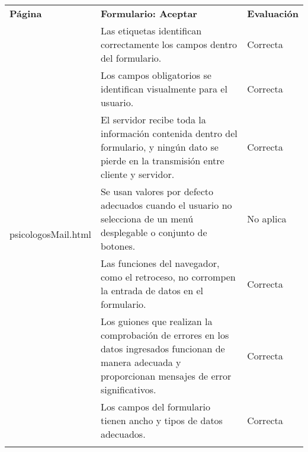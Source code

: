 \begin{table}[htpb]
\centering
\begin{tabularx}{\textwidth}{|l|X|l|}
\hline
\rowcolor[gray]{0.9}\multicolumn{3}{|l|}{\textbf{Anexo PI-010}}                                                                                                                                                                              \\ \hline
\textbf{Página}                       & \textbf{Formulario: Aceptar}                                                                                                                              & \textbf{Evaluación} \\ \hline
\multirow{10}{*}{psicologosMail.html} & Las etiquetas identifican correctamente los campos dentro del formulario.                                                                                 & Correcta            \\ \cline{2-3} 
                                      & Los campos obligatorios se identifican visualmente para el usuario.                                                                                       & Correcta            \\ \cline{2-3} 
                                      & El servidor recibe toda la información contenida dentro del formulario, y ningún dato se pierde en la transmisión entre cliente y servidor.               & Correcta            \\ \cline{2-3} 
                                      & Se usan valores por defecto adecuados cuando el usuario no selecciona de un menú desplegable o conjunto de botones.                                       & No aplica           \\ \cline{2-3} 
                                      & Las funciones del navegador, como el retroceso, no corrompen la entrada de datos en el formulario.                                                        & Correcta            \\ \cline{2-3} 
                                      & Los guiones que realizan la comprobación de errores en los datos ingresados funcionan de manera adecuada y proporcionan mensajes de error significativos. & Correcta            \\ \cline{2-3} 
                                      & Los campos del formulario tienen ancho y tipos de datos adecuados.                                                                                        & Correcta            \\ \cline{2-3} 

\end{tabularx}
\end{table}
